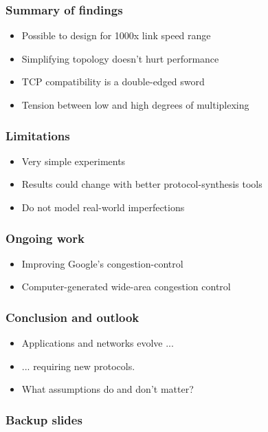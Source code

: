 \documentclass[svgnames]{beamer}
\begin{document}
\begin{Large}
\begin{frame}
\frametitle{Summary of findings}
\begin{itemize}
\item<2-> Possible to design for 1000x link speed range
\item<3-> Simplifying topology doesn't hurt performance
\item<4-> TCP compatibility is a double-edged sword 
\item<5-> Tension between low and high degrees of multiplexing
\end{itemize}
\end{frame}

\begin{frame}
\frametitle{Limitations}
\begin{itemize}
\item<2-> Very simple experiments
\item<3-> Results could change with better protocol-synthesis tools
\item<4-> Do not model real-world imperfections
\end{itemize}
\end{frame}
\begin{frame}

\frametitle{Ongoing work}
\begin{itemize}
\item<2-> Improving Google's congestion-control
\item<3-> Computer-generated wide-area congestion control
\end{itemize}
\end{frame}

\begin{frame}
\frametitle{Conclusion and outlook}
\begin{itemize}
\item<2-> Applications and networks evolve ...
\item<3-> ... requiring new protocols.
\item<4-> What assumptions do and don't matter?
\end{itemize}
\end{frame}

\end{Large}

\begin{frame}
\frametitle{Backup slides}
\end{frame}







\end{document}
